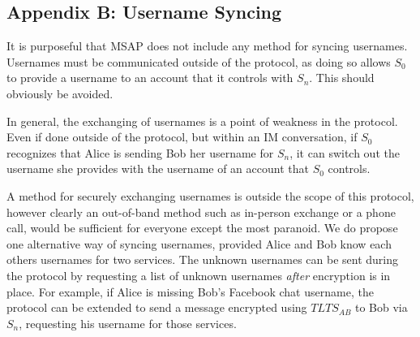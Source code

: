 \documentclass[twoside,10pt]{article}
\begin{document}
\begin{multicols}{2}
\section{Appendix B: Username Syncing}
It is purposeful that MSAP does not include any method for syncing usernames.  Usernames must be communicated outside of the protocol, as doing so allows $S_0$ to provide a username to an account that it controls with $S_n$.  This should obviously be avoided.

In general, the exchanging of usernames is a point of weakness in the protocol.  Even if done outside of the protocol, but within an IM conversation, if $S_0$ recognizes that Alice is sending Bob her username for $S_n$, it can switch out the username she provides with the username of an account that $S_0$ controls.

A method for securely exchanging usernames is outside the scope of this protocol, however clearly an out-of-band method such as in-person exchange or a phone call, would be sufficient for everyone except the most paranoid.  We do propose one alternative way of syncing usernames, provided Alice and Bob know each others usernames for two services.  The unknown usernames can be sent during the protocol by requesting a list of unknown usernames \emph{after} encryption is in place.  For example, if Alice is missing Bob's Facebook chat username, the protocol can be extended to send a message encrypted using $TLTS_{AB}$ to Bob via $S_n$, requesting his username for those services.




\end{multicols}
\end{document}
